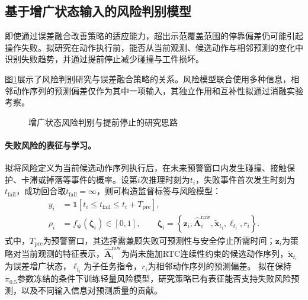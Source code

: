 \subsection{基于增广状态输入的风险判别模型}
\label{subsec:improvement-two}

即使通过误差融合改善策略的适应能力，超出示范覆盖范围的停靠偏差仍可能引起操作失败。拟研究在动作执行前，能否从当前观测、候选动作与相邻预测的变化中识别失败趋势，并通过提前停止减少碰撞与工件损坏。

图\ref{fig:policy-risk-stop-delta}展示了风险判别研究与误差融合策略的关系。风险模型联合使用多种信息，相邻动作序列的预测偏差仅作为其中一项输入，其独立作用和互补性拟通过消融实验考察。

\begin{figure}[htbp]
  \centering
  
  \caption{增广状态风险判别与提前停止的研究思路}
  \label{fig:policy-risk-stop-delta}
\end{figure}

\paragraph{失败风险的表征与学习。}
拟将风险定义为当前候选动作序列执行后，在未来预警窗口内发生碰撞、接触保护、卡滞或掉落等事件的概率。设第\(i\)次推理时刻为\(t_i\)，失败事件首次发生时刻为\(t_{\mathrm{fail}}\)，成功回合取\(t_{\mathrm{fail}}=\infty\)，则可构造监督标签与风险模型：
\begin{equation}
  \begin{aligned}
    y_i &= \mathbb 1\!\left[t_i\le t_{\mathrm{fail}}\le t_i+T_{\mathrm{pre}}\right],\\
    \rho_i &= f_{\boldsymbol\psi}(\boldsymbol\zeta_i)\in[0,1],\qquad
    \boldsymbol\zeta_i = \left\{\mathbf z_i,\widehat{\mathbf A}^{\mathrm{raw}}_i,
    \tilde{\mathbf x}_{t_i},\ell_{t_i},r_i\right\}.
  \end{aligned}
  \label{eq:risk-definition}
\end{equation}
式中，\(T_{\mathrm{pre}}\)为预警窗口，其选择需兼顾失败可预测性与安全停止所需时间；\(\mathbf z_i\)为策略对当前观测的特征表示，\(\widehat{\mathbf A}^{\mathrm{raw}}_i\)为尚未施加RTC连续性约束的候选动作序列，\(\tilde{\mathbf x}_{t_i}\)为误差增广状态，\(\ell_{t_i}\)为子任务指令，\(r_i\)为相邻动作序列的预测偏差。
拟在保持\(\pi_{0.5}\)参数冻结的条件下训练轻量风险模型，研究策略已有表征能否支持失败风险预测，以及不同输入信息对预测质量的贡献。

